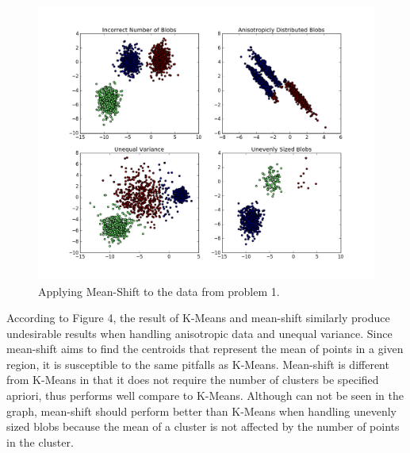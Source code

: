 \documentclass{article}
\begin{document}
\begin{enumerate}
\begin{enumerate}
        \begin{figure}[h]
            \includegraphics[width=1\linewidth]{figure_4.png}
            \caption{Applying Mean-Shift to the data from problem 1.}
            \label{fig:graph4}
        \end{figure}
        According to Figure 4, the result of K-Means and mean-shift similarly produce undesirable results when handling anisotropic data and unequal variance. Since mean-shift aims to find the centroids that represent the mean of points in a given region, it is susceptible to the same pitfalls as K-Means. Mean-shift is different from K-Means in that it does not require the number of clusters be specified apriori, thus performs well compare to K-Means. Although can not be seen in the graph, mean-shift should perform better than K-Means when handling unevenly sized blobs because the mean of a cluster is not affected by the number of points in the cluster.
    \end{enumerate}
\end{enumerate}
\end{document}
